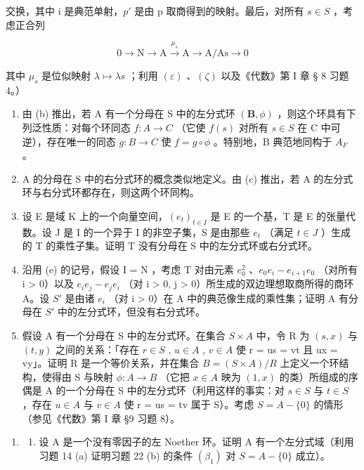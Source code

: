 交换，其中 i 是典范单射，\(p'\) 是由 p 取商得到的映射。最后，对所有 \(s \in S\) ，考虑正合列

\[
0 \longrightarrow \mathrm{N} \longrightarrow \mathrm{A} \xrightarrow {\mu_ {s}} \mathrm{A} \longrightarrow \mathrm{A} / \mathrm{As} \longrightarrow 0
\]

其中 \(\mu_s\) 是位似映射 \(\lambda \mapsto \lambda s\) ；利用 \((\varepsilon)\) 、\((\zeta)\) 以及《代数》第 I 章 § 8 习题 4。）

\begin{enumerate}
\def\labelenumi{(\alph{enumi})}
\setcounter{enumi}{2}
\item
  由 (b) 推出，若 A 有一个分母在 S 中的左分式环 \((\mathbf{B}, \phi)\) ，则这个环具有下列泛性质：对每个环同态 \(f: A \to C\) （它使 \(f(s)\) 对所有 \(s \in S\) 在 C 中可逆），存在唯一的同态 \(g: B \to C\) 使 \(f = g \circ \phi\) 。特别地，B 典范地同构于 \(A_{F}\) 。
\item
  A 的分母在 S 中的右分式环的概念类似地定义。由 (c) 推出，若 A 的左分式环与右分式环都存在，则这两个环同构。
\item
  设 E 是域 K 上的一个向量空间，\((e_{t})_{t\in I}\) 是 E 的一个基，T 是 E 的张量代数。设 J 是 I 的一个异于 I 的非空子集，S 是由那些 \(e_{t}\) （满足 \(t\in J\) ）生成的 T 的乘性子集。证明 T 没有分母在 S 中的左分式环或右分式环。
\item
  沿用 (e) 的记号，假设 I = N ，考虑 T 对由元素 \(e_{0}^{2}\) 、\(e_{0}e_{i} - e_{i+1}e_{0}\) （对所有 i \textgreater{} 0）以及 \(e_{i}e_{j} - e_{j}e_{i}\) （对 i \textgreater{} 0, j \textgreater{} 0）所生成的双边理想取商所得的商环 A。设 \(S'\) 是由诸 \(e_{i}\) （对 i \textgreater{} 0）在 A 中的典范像生成的乘性集；证明 A 有分母在 \(S'\) 中的左分式环，但没有右分式环。
\item
  假设 A 有一个分母在 S 中的左分式环。在集合 \(S \times A\) 中，令 R 为 \((s, x)\) 与 \((t, y)\) 之间的关系：「存在 \(r \in S\) , \(u \in A\) , \(v \in A\) 使 r = us = vt 且 ux = vy」。证明 R 是一个等价关系，并在集合 \(B = (S \times A)/R\) 上定义一个环结构，使得由 S 与映射 \(\phi: A \to B\) （它把 \(x \in A\) 映为 \((1, x)\) 的类）所组成的序偶是 A 的一个分母在 S 中的左分式环（利用这样的事实：对 \(s \in S\) 与 \(t \in S\) ，存在 \(u \in A\) 与 \(v \in A\) 使 r = us = tv 属于 S）。考虑 \(S = A - \{0\}\) 的情形（参见《代数》第 I 章 §9 习题 8）。
\end{enumerate}

\begin{enumerate}
\def\labelenumi{\arabic{enumi}.}
\setcounter{enumi}{22}
\tightlist
\item
  \begin{enumerate}
  \def\labelenumii{(\alph{enumii})}
  \tightlist
  \item
    设 A 是一个没有零因子的左 Noether 环。证明 A 有一个左分式域（利用习题 14 (a) 证明习题 22 (b) 的条件 \((\beta_{1})\) 对 \(S = A - \{0\}\) 成立）。
  \end{enumerate}
\end{enumerate}

